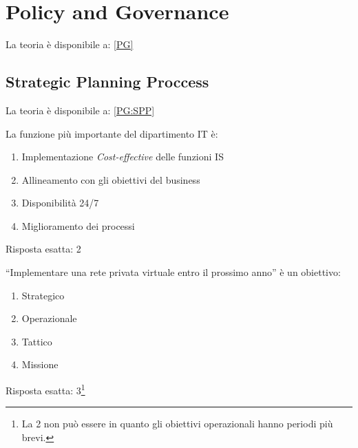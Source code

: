 \section{Policy and Governance}
\label{esPG}

La teoria è disponibile a: \ref{PG}

\subsection{Strategic Planning Proccess}
\label{esPG:SPP}

La teoria è disponibile a: \ref{PG:SPP}

\begin{Exercise} [
  title={Quiz},
  label={esPG1}
  ]

  \Question La funzione più importante del dipartimento IT è:
  \begin{enumerate}
   \item Implementazione \textit{Cost-effective} delle funzioni IS
   \item Allineamento con gli obiettivi del business
   \item Disponibilità 24/7
   \item Miglioramento dei processi
  \end{enumerate}
  
\end{Exercise}

\begin{Answer} [
  ref={esPG1},
  number={1}
  ]

  \Question Risposta esatta: 2
\end{Answer}



\begin{Exercise} [
  title={Quiz},
  label={esPG2}
  ]

  \Question ``Implementare una rete privata virtuale entro il prossimo anno'' è 
un obiettivo:
\begin{enumerate}
 \item Strategico
 \item Operazionale
 \item Tattico
 \item Missione
\end{enumerate}

\end{Exercise}

\begin{Answer} [
  ref={esPG2},
  number={2}
  ]

  \Question Risposta esatta: 3\footnote{La 2 non può essere in quanto gli 
obiettivi operazionali hanno periodi più brevi.}
\end{Answer}



